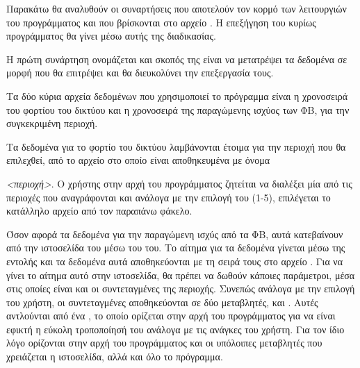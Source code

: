 \documentclass[12pt]{report}
\begin{document}
Παρακάτω θα αναλυθούν οι συναρτήσεις που αποτελούν τον κορμό των λειτουργιών του προγράμματος και που βρίσκονται
στο αρχείο {}. Η επεξήγηση του κυρίως προγράμματος {} θα γίνει μέσω αυτής της διαδικασίας.

Η πρώτη συνάρτηση ονομάζεται {} και σκοπός της είναι να μετατρέψει τα δεδομένα
σε μορφή που θα επιτρέψει και θα διευκολύνει την επεξεργασία τους.

Τα δύο κύρια αρχεία δεδομένων που χρησιμοποιεί το πρόγραμμα είναι η χρονοσειρά του φορτίου του δικτύου και η 
χρονοσειρά της παραγώμενης ισχύος των ΦΒ, για την συγκεκριμένη περιοχή. 

Τα δεδομένα για το φορτίο του δικτύου λαμβάνονται έτοιμα για την περιοχή που θα επιλεχθεί, από το αρχείο στο οποίο
είναι αποθηκευμένα με όνομα {{}\textit{<περιοχή>}{}. 
Ο χρήστης στην αρχή του προγράμματος ζητείται να διαλέξει μία από τις περιοχές που αναγράφονται και ανάλογα με την
επιλογή του (1-5), επιλέγεται το κατάλληλο αρχείο από τον παραπάνω φάκελο.

{}

Όσον αφορά τα δεδομένα για την παραγώμενη ισχύς από τα ΦΒ, αυτά κατεβαίνουν από την ιστοσελίδα του 
{} μέσω του {} του. Το αίτημα για τα δεδομένα γίνεται 
μέσω της εντολής {} και τα δεδομένα αυτά αποθηκεύονται με τη σειρά τους στο αρχείο {}.
Για να γίνει το αίτημα αυτό στην ιστοσελίδα, θα πρέπει να δωθούν κάποιες παράμετροι, μέσα στις οποίες είναι και οι 
συντεταγμένες της περιοχής. Συνεπώς ανάλογα με την επιλογή του χρήστη, οι συντεταγμένες αποθηκεύονται σε δύο 
μεταβλητές, {} και {}. Αυτές αντλούνται από ένα {}, το οποίο
ορίζεται στην αρχή του προγράμματος για να είναι εφικτή η εύκολη τροποποίησή του ανάλογα με τις ανάγκες του χρήστη.
Για τον ίδιο λόγο ορίζονται στην αρχή του προγράμματος και οι υπόλοιπες μεταβλητές που χρειάζεται η ιστοσελίδα, 
αλλά και όλο το πρόγραμμα.

}
\end{document}
